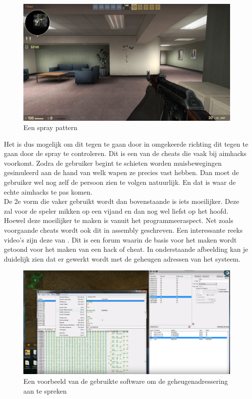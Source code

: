 \documentclass[pdftex,a4paper,12pt,twoside]{report}
\begin{document}
\begin{figure}[!hb]
\centering
\includegraphics[width=15cm]{img/spraypattern-example}
\caption{Een spray pattern}
\end{figure}  

Het is dus mogelijk om dit tegen te gaan door in omgekeerde richting dit tegen te gaan door de spray te controleren. Dit is een van de cheats die vaak bij aimhacks voorkomt. Zodra de gebruiker begint te schieten worden muisbewegingen gesimuleerd aan de hand van welk wapen ze precies vast hebben. Dan moet de gebruiker wel nog zelf de persoon zien te volgen natuurlijk. En dat is waar de echte aimhacks te pas komen.
\\

De 2e vorm die vaker gebruikt wordt dan bovenstaande is iets moeilijker. Deze zal voor de speler mikken op een vijand en dan nog wel liefst op het hoofd. Hoewel deze moeilijker te maken is vanuit het programmeeraspect. Net zoals voorgaande cheats wordt ook dit in assembly geschreven. Een interessante reeks video's zijn deze van \cite{basicaimbottutorial}. Dit is een forum waarin de basis voor het maken wordt getoond voor het maken van een hack of cheat. In onderstaande afbeelding kan je duidelijk zien dat er gewerkt wordt met de geheugen adressen van het systeem. 

\begin{figure}
\centering
\includegraphics[width=15cm]{img/aimhack-code-example}
\caption{Een voorbeeld van de gebruikte software om de geheugenadressering aan te spreken}
\end{figure}
\end{document}

